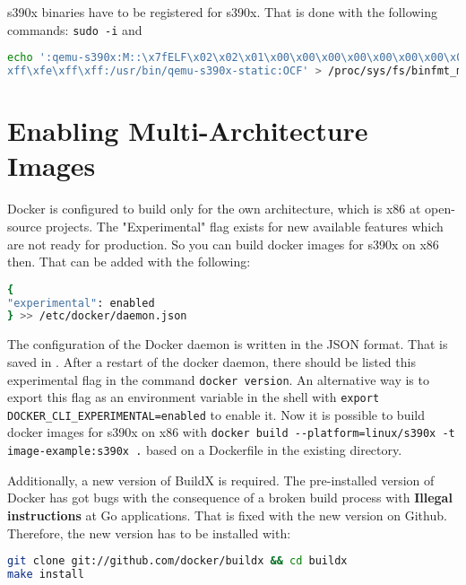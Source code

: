 s390x binaries have to be registered for s390x. That is done with the following commands: \lstinline!sudo -i! and \begin{lstlisting}[language=bash, numberstyle=\myHexNumber, caption={Register s390x binaries},captionpos=b]
echo ':qemu-s390x:M::\x7fELF\x02\x02\x01\x00\x00\x00\x00\x00\x00\x00\x00\x00\x00\x02\x00\x16:\xff\xff\xff\xff\xff\xff\xff\x00\xff\xff\xff\xff\xff\xff\xff\xff\
xff\xfe\xff\xff:/usr/bin/qemu-s390x-static:OCF' > /proc/sys/fs/binfmt_misc/register
\end{lstlisting}

\section{Enabling Multi-Architecture Images}\label{Multi-Architecture-Images}

Docker is configured to build only for the own architecture, which is x86 at open-source projects. The "Experimental" flag exists for new available features which are not ready for production. So you can build docker images for s390x on x86 then. That can be added with the following:

\begin{lstlisting}[language=bash,caption={Docker Experimental Flag},captionpos=b]
{
"experimental": enabled
} >> /etc/docker/daemon.json
\end{lstlisting}

The configuration of the Docker daemon is written in the JSON format. That is saved in .
After a restart of the docker daemon, there should be listed this experimental flag in the command  \lstinline!docker version!. An alternative way is to export this flag as an environment variable in the shell with  \lstinline!export DOCKER_CLI_EXPERIMENTAL=enabled! to enable it. Now it is possible to build docker images for s390x on x86 with  \lstinline!docker build --platform=linux/s390x -t image-example:s390x .! based on a Dockerfile in the existing directory.

 
Additionally, a new version of BuildX is required. The pre-installed version of Docker has got bugs with the consequence of a broken build process with \textbf{Illegal instructions} at Go applications. That is fixed with the new version on Github. \\
Therefore, the new version has to be installed with:
\begin{lstlisting}[language=bash,caption={BuildX Upgrade},captionpos=b]
git clone git://github.com/docker/buildx && cd buildx
make install
\end{lstlisting}
 

